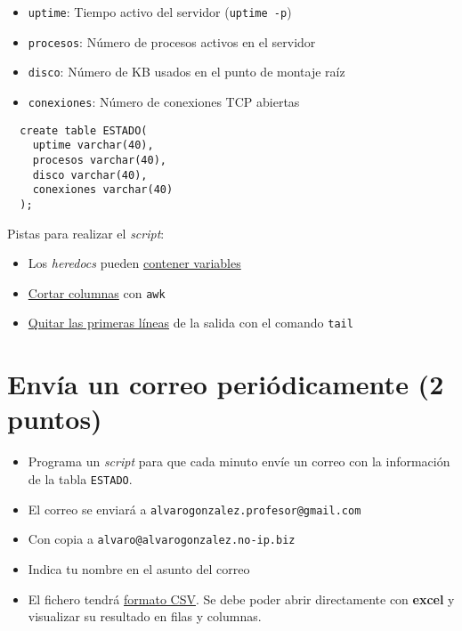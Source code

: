\documentclass{article}
\begin{document}
\begin{itemize}
\item \texttt{uptime}: Tiempo activo del servidor (\texttt{uptime -p})
\item \texttt{procesos}: Número de procesos activos en el servidor
\item \texttt{disco}: Número de KB usados en el punto de montaje raíz
\item \texttt{conexiones}: Número de conexiones TCP abiertas
\end{itemize}


\begin{lstlisting}
  create table ESTADO(
    uptime varchar(40),
    procesos varchar(40),
    disco varchar(40),
    conexiones varchar(40)
  );
\end{lstlisting}


\begin{Aviso}
Pistas para realizar el \emph{script}:
\begin{itemize}
\item Los \emph{heredocs} pueden \href{http://superuser.com/questions/456615/how-to-pass-variables-to-a-heredoc-in-bash}{contener variables}
\item \href{https://www.cyberciti.biz/tips/processing-the-delimited-files-using-cut-and-awk.html}{Cortar columnas} con \texttt{awk}
\item \href{https://linuxconfig.org/commands-on-how-to-delete-a-first-line-from-a-text-file-using-bash-shell}{Quitar las primeras líneas} de la salida con el comando \texttt{tail}
\end{itemize}
\end{Aviso}


\section{Envía un correo periódicamente (2 puntos)}
\label{sec:org000000f}
\begin{itemize}
\item Programa un \emph{script} para que cada minuto envíe un correo con la información de la tabla \texttt{ESTADO}.
\item El correo se enviará a \texttt{alvarogonzalez.profesor@gmail.com}
\item Con copia a \texttt{alvaro@alvarogonzalez.no-ip.biz}
\item Indica tu nombre en el asunto del correo
\item El fichero tendrá \href{https://stackoverflow.com/questions/643137/how-do-i-spool-to-a-csv-formatted-file-using-sqlplus\#654723}{formato CSV}. Se debe poder abrir directamente con \textbf{excel} y visualizar su resultado en filas y columnas.
\end{itemize}
\end{document}
